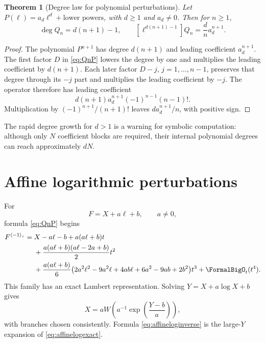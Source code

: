 \documentclass[11pt,oneside,openany]{book}
\newtheorem{theorem}{Theorem}[chapter]
\newcommand{\rev}{^{\langle-1\rangle_{\circ}}}
\begin{document}
\begin{theorem}[Degree law for polynomial perturbations]
\label{thm:degreeP}
Let \(P(\ell)=a_d\ell^d+\text{lower powers}\), with \(d\geq1\) and
\(a_d\neq0\).  Then for \(n\geq1\),
\begin{equation}\label{eq:Qdegree}
 \deg Q_n=d(n+1)-1,
 \qquad
 [\ell^{d(n+1)-1}]Q_n=\frac{d}{n}a_d^{n+1}.
\end{equation}
\end{theorem}

\begin{proof}
The polynomial \(P^{n+1}\) has degree \(d(n+1)\) and leading coefficient
\(a_d^{n+1}\).  The first factor \(D\) in \cref{eq:QnP} lowers the degree by
one and multiplies the leading coefficient by \(d(n+1)\).  Each later factor
\(D-j\), \(j=1,\ldots,n-1\), preserves that degree through its \(-j\) part and
multiplies the leading coefficient by \(-j\).  The operator therefore has
leading coefficient
\[
 d(n+1)a_d^{n+1}(-1)^{n-1}(n-1)!.
\]
Multiplication by \((-1)^{n+1}/(n+1)!\) leaves
\(d a_d^{n+1}/n\), with positive sign.
\end{proof}

The rapid degree growth for \(d>1\) is a warning for symbolic computation:
although only \(N\) coefficient blocks are required, their internal polynomial
degrees can reach approximately \(dN\).

\section{Affine logarithmic perturbations}
For
\begin{equation}\label{eq:affinelogF}
 F=X+a\ell+b,
 \qquad a\neq0,
\end{equation}
formula \cref{eq:QnP} begins
\begin{align}
 F\rev={}&X-a\ell-b
 +a(a\ell+b)t\notag\\
 &+\frac{a(a\ell+b)(a\ell-2a+b)}{2}t^2\notag\\
 &+\frac{a(a\ell+b)}{6}
 \bigl(2a^2\ell^2-9a^2\ell+4ab\ell
       +6a^2-9ab+2b^2\bigr)t^3
 +\FormalBigO_t(t^4).
 \label{eq:affineloginverse}
\end{align}
This family has an exact Lambert representation.  Solving
\(Y=X+a\log X+b\) gives
\begin{equation}\label{eq:affinelogexact}
 X=aW\!\left(a^{-1}\exp\!\left(\frac{Y-b}{a}\right)\right),
\end{equation}
with branches chosen consistently.  Formula \cref{eq:affineloginverse} is the
large-\(Y\) expansion of \cref{eq:affinelogexact}.
\end{document}

